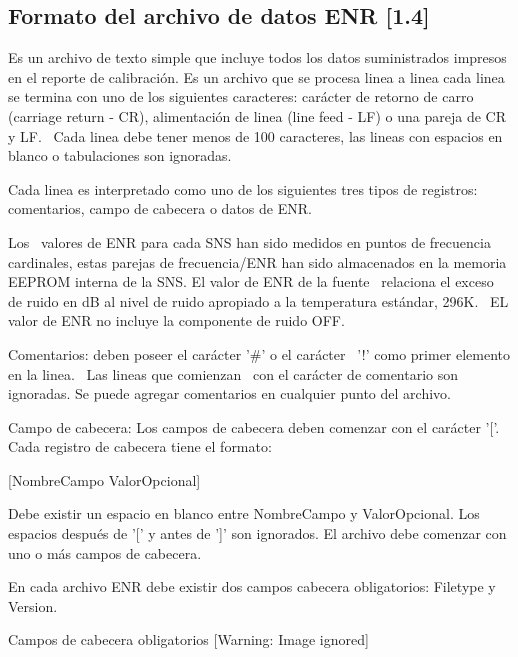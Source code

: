 \documentclass{article}
\begin{document}
\bigskip

\subsection{Formato del archivo de datos ENR [1.4]}
Es un archivo de texto simple que incluye todos los datos suministrados impresos en el reporte de calibración. Es un archivo que se procesa linea a linea cada linea se termina con uno de los siguientes caracteres: carácter de retorno de carro (carriage return - CR), alimentación de linea (line feed - LF) o una pareja de CR y LF. \ Cada linea debe tener menos de 100 caracteres, las lineas con espacios en blanco o tabulaciones son ignoradas.

Cada linea es interpretado como uno de los siguientes tres tipos de registros: comentarios, campo de cabecera o datos de ENR.

Los \ valores de ENR para cada SNS han sido medidos en puntos de frecuencia cardinales, estas parejas de frecuencia/ENR han sido almacenados en la memoria EEPROM interna de la SNS. El valor de ENR de la fuente \ relaciona el exceso de ruido en dB al nivel de ruido apropiado a la temperatura estándar, 296K. \ EL valor de ENR no incluye la componente de ruido OFF.

Comentarios: deben poseer el carácter '\#' o el carácter \ {}'!' como primer elemento en la linea. \ Las lineas que comienzan \ con el carácter de comentario son ignoradas. Se puede agregar comentarios en cualquier punto del archivo.

Campo de cabecera: Los campos de cabecera deben comenzar con el carácter '['. Cada registro de cabecera tiene el formato:

[NombreCampo ValorOpcional]

Debe existir un espacio en blanco entre NombreCampo y ValorOpcional. Los espacios después de '[' y antes de ']' son ignorados. El archivo debe comenzar con uno o más campos de cabecera.

En cada archivo ENR debe existir dos campos cabecera obligatorios: Filetype y Version.



\begin{center}
\begin{minipage}{11.61cm}
Campos de cabecera obligatorios
 [Warning: Image ignored] %
\end{minipage}
\end{center}
\end{document}
